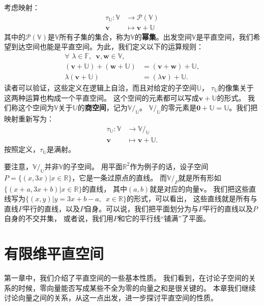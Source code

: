 \documentclass[12pt,UTF8]{ctexbook}
\begin{document}
考虑映射：
\begin{align*}
    \tau_\mathbb{U}: \mathbb{V} &\rightarrow \mathcal{P}(\mathbb{V})  \\
    \mathbf{v} &\mapsto \mathbf{v} + \mathbb{U}
\end{align*}
其中的$\mathcal{P}(\mathbb{V})$是$\mathbb{V}$所有子集的集合，称为$\mathbb{V}$的\textbf{幂集}。出发空间$\mathbb{V}$是平直空间，我们希望到达空间也能是平直空间。为此，我们定义以下的运算规则：
\begin{align*}
    \forall \,\,\lambda \in \mathbb{F}, \,\,\, \mathbf{v}, \mathbf{w} \in \mathbb{V}, \\
    \left(\mathbf{v} + \mathbb{U}\right) + \left(\mathbf{w} + \mathbb{U}\right) &= (\mathbf{v} + \mathbf{w}) + \mathbb{U},  \\
    \lambda \left(\mathbf{v} + \mathbb{U}\right) &= (\lambda\mathbf{v}) + \mathbb{U}. 
\end{align*}
读者可以验证，这些定义在逻辑上自洽，而且对给定的子空间$\mathbb{U}$，
$\tau_\mathbb{U}$的像集关于这两种运算也构成一个平直空间。
这个空间的元素都可以写成$\mathbf{v} + \mathbb{U}$的形式。
我们称这个空间为$\mathbb{V}$关于$\mathbb{U}$的\textbf{商空间}，记为$\mathbb{V}/_\mathbb{U}$。
$\mathbb{V}/_\mathbb{U}$的零元素是$\mathbf{0} + \mathbb{U} = \mathbb{U}$。我们把映射重新写为：
\begin{align*}
    \tau_\mathbb{U}: \mathbb{V} &\rightarrow \mathbb{V}/_\mathbb{U}  \\
    \mathbf{v} &\mapsto \mathbf{v} + \mathbb{U}.
\end{align*}
按照定义，$\tau_\mathbb{U}$是满射。

要注意，$\mathbb{V}/_\mathbb{U}$并非$\mathbb{V}$的子空间。
用平面$\mathbb{R}^2$作为例子的话，设子空间$P = \{(x, 3x) |x \in \mathbb{R}\}$，它是一条过原点的直线。
而$\mathbb{V}/_P$就是所有形如$\{(x + a, 3x + b) |x \in \mathbb{R}\}$的直线，
其中$(a, b)$就是对应的向量$\mathbf{v}$。
我们把这些直线写为$\{(x, y) |y = 3x + b - a , \,\,\,x \in \mathbb{R}\}$的形式，可以看出，
这些直线就是所有与直线$P$平行的直线，以及$P$自身。可以说，我们把平面划分为与$P$平行的直线以及$P$自身的不交并集，
或者说，我们用$P$和它的平行线“铺满”了平面。

\chapter{有限维平直空间}

第一章中，我们介绍了平直空间的一些基本性质。
我们看到，在讨论子空间的关系的时候，零向量能否写成某些不全为零的向量之和是很关键的。
本章我们继续讨论向量之间的关系，从这一点出发，进一步探讨平直空间的性质。
\end{document}
